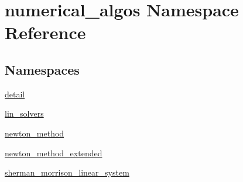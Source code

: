 \hypertarget{namespacenumerical__algos}{\section{numerical\-\_\-algos Namespace Reference}
\label{namespacenumerical__algos}
}
\subsection*{Namespaces}
\begin{DoxyCompactItemize}
\item 
\hyperlink{namespacenumerical__algos_1_1detail}{detail}
\item 
\hyperlink{namespacenumerical__algos_1_1lin__solvers}{lin\-\_\-solvers}
\item 
\hyperlink{namespacenumerical__algos_1_1newton__method}{newton\-\_\-method}
\item 
\hyperlink{namespacenumerical__algos_1_1newton__method__extended}{newton\-\_\-method\-\_\-extended}
\item 
\hyperlink{namespacenumerical__algos_1_1sherman__morrison__linear__system}{sherman\-\_\-morrison\-\_\-linear\-\_\-system}
\end{DoxyCompactItemize}
